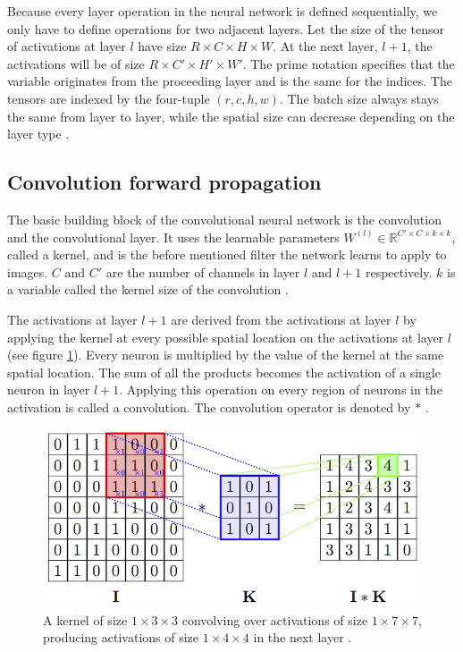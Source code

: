\documentclass[a4paper, twoside]{article}
\begin{document}
Because every layer operation in the neural network is defined sequentially, we only have to define operations for two adjacent layers. Let the size of the tensor of activations at layer $l$ have size $R \times C \times H \times W$. At the next layer, $l+1$, the activations will be of size $R \times C' \times H' \times W'$. The prime notation specifies that the variable originates from the proceeding layer and is the same for the indices. The tensors are indexed by the four-tuple $(r, c, h, w)$. The batch size always stays the same from layer to layer, while the spatial size can decrease depending on the layer type \cite{cs231n} \cite{convmath}. 

\subsection{Convolution forward propagation}
The basic building block of the convolutional neural network is the convolution and the convolutional layer. It uses the learnable parameters $W^{(l)} \in \mathbb{R}^{C' \times C  \times k \times k}$, called a kernel, and is the before mentioned filter the network learns to apply to images. $C$ and $C'$ are the number of channels in layer $l$ and $l+1$ respectively. $k$ is a variable called the kernel size of the convolution \cite{cs231n}. 

The activations at layer $l+1$ are derived from the activations at layer $l$ by applying the kernel at every possible spatial location on the activations at layer $l$ (see figure \ref{figkonv}). Every neuron is multiplied by the value of the kernel at the same spatial location. The sum of all the products becomes the activation of a single neuron in layer $l+1$. Applying this operation on every region of neurons in the activation is called a convolution. The convolution operator is denoted by $*$ \cite{cs231n} \cite{convmath} \cite{convarithmetic}. 

\begin{figure}[h]
	\centering
  		\includegraphics[scale=2.1]{convolution.png}
  	\caption{A kernel of size $1 \times 3 \times 3$ convolving over activations of size $1 \times 7 \times 7$, producing activations of size $1 \times 4 \times 4$ in the next layer \cite{figconv}. } \label{figkonv}
\end{figure}
\end{document}

